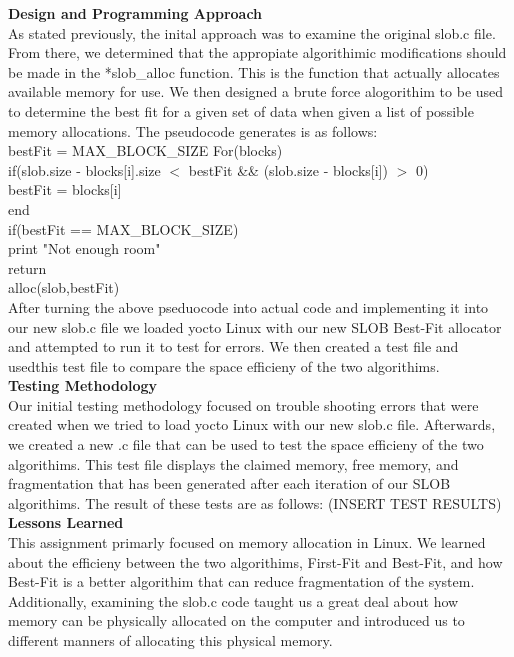 \documentclass[letterpaper,10pt,draftclsnofoot,titlepage,onecolumn]{IEEEtran}
\begin{document}
		
	\textbf{Design and Programming Approach}\\

	As stated previously, the inital approach was to examine the original slob.c file. From there, we determined that the appropiate algorithimic modifications should be made in the *slob\_alloc function. This is the function that actually allocates available memory for use. We then designed a brute force alogorithim to be used to determine the best fit for a given set of data when given a list of possible memory allocations. The pseudocode generates is as follows: \\
	
	bestFit = MAX\_BLOCK\_SIZE
	For(blocks) \\
		if(slob.size - blocks[i].size $<$ bestFit \&\& (slob.size - blocks[i]) $>$ 0)\\
			bestFit = blocks[i] \\
	end \\

	if(bestFit == MAX\_BLOCK\_SIZE) \\
		print "Not enough room"	\\
		return \\
	alloc(slob,bestFit)\\
	
	After turning the above pseduocode into actual code and implementing it into our new slob.c file we loaded yocto Linux with our new SLOB Best-Fit allocator and attempted to run it to test for errors. We then created a test file and usedthis test file to compare the space efficieny of the two algorithims.\\ 
 
	\textbf{Testing Methodology}\\
	
	Our initial testing methodology focused on trouble shooting errors that were created when we tried to load yocto Linux with our new slob.c file. Afterwards, we created a new .c file that can be used to test the space efficieny of the two algorithims. This test file displays the claimed memory, free memory, and fragmentation that has been generated after each iteration of our SLOB algorithims. The result of these tests are as follows: (INSERT TEST RESULTS)\\


	\textbf{Lessons Learned}\\

	This assignment primarly focused on memory allocation in Linux. We learned about the efficieny between the two algorithims, First-Fit and Best-Fit, and how Best-Fit is a better algorithim that can reduce fragmentation of the system. Additionally, examining the slob.c code taught us a great deal about how memory can be physically allocated on the computer and introduced us to different manners of allocating this physical memory. 
\end{document}
